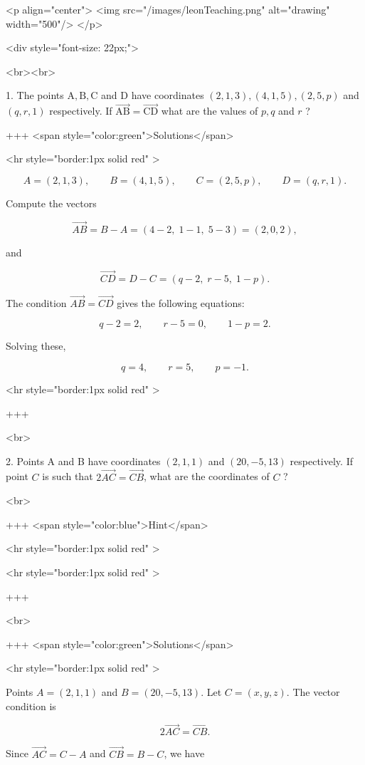<p align="center">
<img src="/images/leonTeaching.png" alt="drawing" width="500"/>
</p>

<div style="font-size: 22px;">

<br><br>

1. The points $\mathrm{A}, \mathrm{B}, \mathrm{C}$ and D have coordinates $(2,1,3),(4,1,5),(2,5, p)$ and $(q, r, 1)$ respectively. If $\overrightarrow{\mathrm{AB}}=\overrightarrow{\mathrm{CD}}$ what are the values of $p, q$ and $r$ ?

+++ <span style="color:green">Solutions</span>

<hr style="border:1px solid red" >

$$
A=(2,1,3),\qquad B=(4,1,5),\qquad C=(2,5,p),\qquad D=(q,r,1).
$$

Compute the vectors

$$
\overrightarrow{AB}=B-A=(4-2,\;1-1,\;5-3)=(2,0,2),
$$

and

$$
\overrightarrow{CD}=D-C=(q-2,\;r-5,\;1-p).
$$

The condition $\overrightarrow{AB}=\overrightarrow{CD}$ gives the following equations:

$$
q-2=2,\qquad r-5=0,\qquad 1-p=2.
$$

Solving these,

$$
q=4,\qquad r=5,\qquad p=-1.
$$

<hr style="border:1px solid red" >

+++

<br>

2. Points A and B have coordinates $(2,1,1)$ and $(20,-5,13)$ respectively. If point $C$ is such that $2 \overrightarrow{A C}=\overrightarrow{C B}$, what are the coordinates of $C$ ?

<br>

+++ <span style="color:blue">Hint</span>

<hr style="border:1px solid red" >

<hr style="border:1px solid red" >

+++

<br>

+++ <span style="color:green">Solutions</span>

<hr style="border:1px solid red" >

Points $A=(2,1,1)$ and $B=(20,-5,13)$. Let $C=(x,y,z)$. The vector condition is

$$
2\overrightarrow{AC}=\overrightarrow{CB}.
$$

Since $\overrightarrow{AC}=C-A$ and $\overrightarrow{CB}=B-C$, we have

